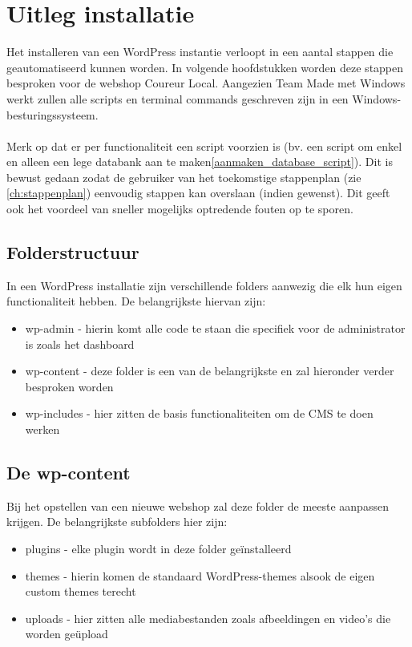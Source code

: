 \section{Uitleg installatie}
Het installeren van een WordPress instantie verloopt in een aantal stappen die geautomatiseerd kunnen worden. In volgende hoofdstukken worden deze stappen besproken voor de webshop Coureur Local. Aangezien Team Made met Windows werkt zullen alle scripts en terminal commands geschreven zijn in een Windows-besturingssysteem.
\\\\
Merk op dat er per functionaliteit een script voorzien is (bv. een script om enkel en alleen een lege databank aan te maken\ref{aanmaken_database_script}). Dit is bewust gedaan zodat de gebruiker van het toekomstige stappenplan (zie \ref{ch:stappenplan}) eenvoudig stappen kan overslaan (indien gewenst). Dit geeft ook het voordeel van sneller mogelijks optredende fouten op te sporen. 
\subsection{Folderstructuur}
In een WordPress installatie zijn verschillende folders aanwezig die elk hun eigen functionaliteit hebben. De belangrijkste hiervan zijn:
\begin{itemize}
    \item wp-admin - hierin komt alle code te staan die specifiek voor de administrator is zoals het dashboard
    \item wp-content - deze folder is een van de belangrijkste en zal hieronder verder besproken worden
    \item wp-includes - hier zitten de basis functionaliteiten om de CMS te doen werken
\end{itemize} 

\subsection{De wp-content}
Bij het opstellen van een nieuwe webshop zal deze folder de meeste aanpassen krijgen. De belangrijkste subfolders hier zijn:
\begin{itemize}
    \item plugins - elke plugin wordt in deze folder geïnstalleerd
    \item themes - hierin komen de standaard WordPress-themes alsook de eigen custom themes terecht
    \item uploads - hier zitten alle mediabestanden zoals afbeeldingen en video's die worden geüpload 
\end{itemize} 
